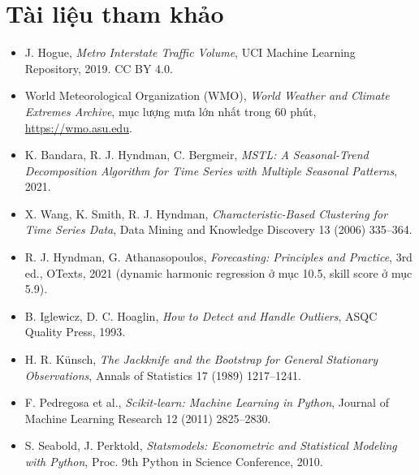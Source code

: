 \section{Tài liệu tham khảo}
\begin{itemize}[leftmargin=1.5cm]
    \item J. Hogue, \textit{Metro Interstate Traffic Volume}, UCI Machine Learning Repository, 2019. CC BY 4.0.
    \item World Meteorological Organization (WMO), \textit{World Weather and Climate Extremes Archive}, mục lượng mưa lớn nhất trong 60 phút, \url{https://wmo.asu.edu}.
    \item K. Bandara, R. J. Hyndman, C. Bergmeir, \textit{MSTL: A Seasonal-Trend Decomposition Algorithm for Time Series with Multiple Seasonal Patterns}, 2021.
    \item X. Wang, K. Smith, R. J. Hyndman, \textit{Characteristic-Based Clustering for Time Series Data}, Data Mining and Knowledge Discovery 13 (2006) 335--364.
    \item R. J. Hyndman, G. Athanasopoulos, \textit{Forecasting: Principles and Practice}, 3rd ed., OTexts, 2021 (dynamic harmonic regression ở mục 10.5, skill score ở mục 5.9).
    \item B. Iglewicz, D. C. Hoaglin, \textit{How to Detect and Handle Outliers}, ASQC Quality Press, 1993.
    \item H. R. Künsch, \textit{The Jackknife and the Bootstrap for General Stationary Observations}, Annals of Statistics 17 (1989) 1217--1241.
    \item F. Pedregosa et al., \textit{Scikit-learn: Machine Learning in Python}, Journal of Machine Learning Research 12 (2011) 2825--2830.
    \item S. Seabold, J. Perktold, \textit{Statsmodels: Econometric and Statistical Modeling with Python}, Proc. 9th Python in Science Conference, 2010.
\end{itemize}

\fussy
